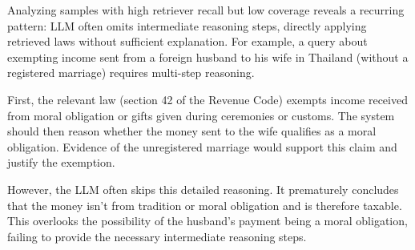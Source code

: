 



Analyzing samples with high retriever recall but low coverage reveals a recurring pattern: LLM often omits intermediate reasoning steps, directly applying retrieved laws without sufficient explanation. For example, a query about exempting income sent from a foreign husband to his wife in Thailand (without a registered marriage) requires multi-step reasoning.

First, the relevant law (section 42 of the Revenue Code) exempts income received from moral obligation or gifts given during ceremonies or customs. The system should then reason whether the money sent to the wife qualifies as a moral obligation. Evidence of the unregistered marriage would support this claim and justify the exemption.

However, the LLM often skips this detailed reasoning. It prematurely concludes that the money isn't from tradition or moral obligation and is therefore taxable. This overlooks the possibility of the husband's payment being a moral obligation, failing to provide the necessary intermediate reasoning steps.


